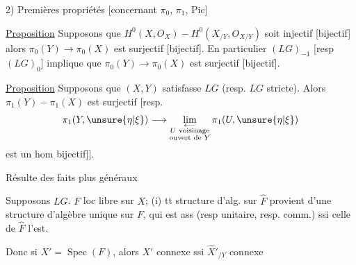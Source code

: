 
2) Premières propriétés [concernant $\pi_0$, $\pi_1$, Pic]

\uline{Proposition} Supposons que
$H^0(X,O_X)\mathbin{-}H^0(X_{/Y},O_{X/Y})$
soit injectif [bijectif] alors
$\pi_0(Y)\longrightarrow\pi_0(X)$ est surjectif [bijectif].
En particulier $(LG)_{-1}$ [resp $(LG)_0$] implique que
$\pi_0(Y)\longrightarrow\pi_0(X)$ est surjectif [bijectif].

\uline{Proposition} Supposons que $(X,Y)$ satisfasse
$LG$ (resp. $LG$ stricte).
Alors $\pi_1(Y)\mathbin{-}\pi_1(X)$ est surjectif [resp.
\[
\pi_1(Y,\unsure{\eta|\xi})\longrightarrow
\mathop{\mathrm{lim}}_{\substack{\longleftarrow\\
U\text{ voisinage}\\\text{ouvert de }Y}}
\pi_1(U,\unsure{\eta|\xi})
\]
est un hom \deleted{surjectif [resp.} bijectif]].

Résulte des faits plus généraux

\uline{} 
Supposons $LG$. 
$F$ loc libre sur $X$;
(i) tt structure d'alg.
 sur $\hat F$ provient d'une structure
d'algèbre unique sur $F$, qui est ass (resp unitaire,
resp. comm.) ssi celle de $\hat F$ l'est.

Donc si $X'=\operatorname{Spec}(F)$, alors $X'$ connexe
ssi $\hat X'_{/Y}$ connexe




